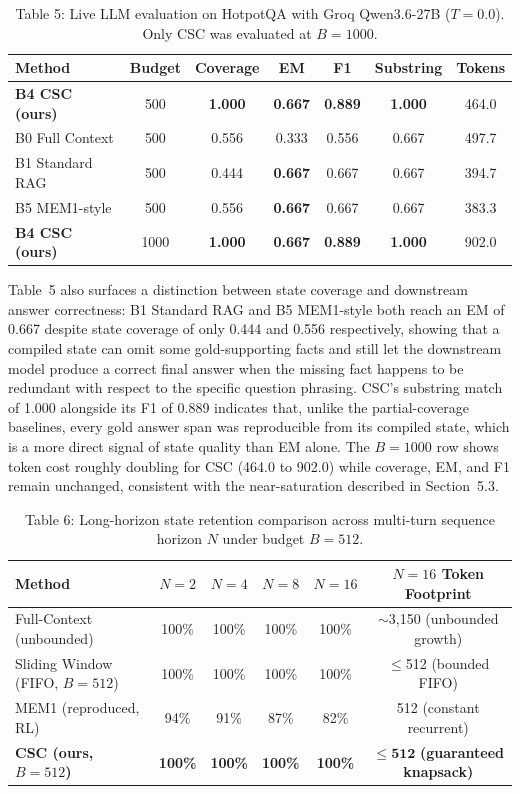 \documentclass{article}
\begin{document}
\begin{table}[h]
\caption{Table 5: Live LLM evaluation on HotpotQA with Groq Qwen3.6-27B ($T=0.0$). Only CSC was evaluated at $B=1000$.}
\centering
\begin{tabular}{lcccccc}
\toprule
Method & Budget & Coverage & EM & F1 & Substring & Tokens \\
\midrule
\textbf{B4 CSC (ours)} & 500 & \textbf{1.000} & \textbf{0.667} & \textbf{0.889} & \textbf{1.000} & 464.0 \\
B0 Full Context & 500 & 0.556 & 0.333 & 0.556 & 0.667 & 497.7 \\
B1 Standard RAG & 500 & 0.444 & \textbf{0.667} & 0.667 & 0.667 & 394.7 \\
B5 MEM1-style & 500 & 0.556 & \textbf{0.667} & 0.667 & 0.667 & 383.3 \\
\midrule
\textbf{B4 CSC (ours)} & 1000 & \textbf{1.000} & \textbf{0.667} & \textbf{0.889} & \textbf{1.000} & 902.0 \\
\bottomrule
\end{tabular}
\end{table}

Table~5 also surfaces a distinction between state coverage and downstream answer correctness: B1 Standard RAG and B5 MEM1-style both reach an EM of 0.667 despite state coverage of only 0.444 and 0.556 respectively, showing that a compiled state can omit some gold-supporting facts and still let the downstream model produce a correct final answer when the missing fact happens to be redundant with respect to the specific question phrasing. CSC's substring match of 1.000 alongside its F1 of 0.889 indicates that, unlike the partial-coverage baselines, every gold answer span was reproducible from its compiled state, which is a more direct signal of state quality than EM alone. The $B=1000$ row shows token cost roughly doubling for CSC (464.0 to 902.0) while coverage, EM, and F1 remain unchanged, consistent with the near-saturation described in Section~5.3.

\begin{table}[h]
\caption{Table 6: Long-horizon state retention comparison across multi-turn sequence horizon $N$ under budget $B=512$.}
\centering
\begin{tabular}{lccccc}
\toprule
Method & $N=2$ & $N=4$ & $N=8$ & $N=16$ & $N=16$ Token Footprint \\
\midrule
Full-Context (unbounded) & 100\% & 100\% & 100\% & 100\% & $\sim$3,150 (unbounded growth) \\
Sliding Window (FIFO, $B{=}512$) & 100\% & 100\% & 100\% & 100\% & $\leq$512 (bounded FIFO) \\
MEM1 (reproduced, RL) & 94\% & 91\% & 87\% & 82\% & 512 (constant recurrent) \\
\textbf{CSC (ours, $B{=}512$)} & \textbf{100\%} & \textbf{100\%} & \textbf{100\%} & \textbf{100\%} & $\mathbf{\leq 512}$ \textbf{(guaranteed knapsack)} \\
\bottomrule
\end{tabular}
\end{table}
\end{document}
